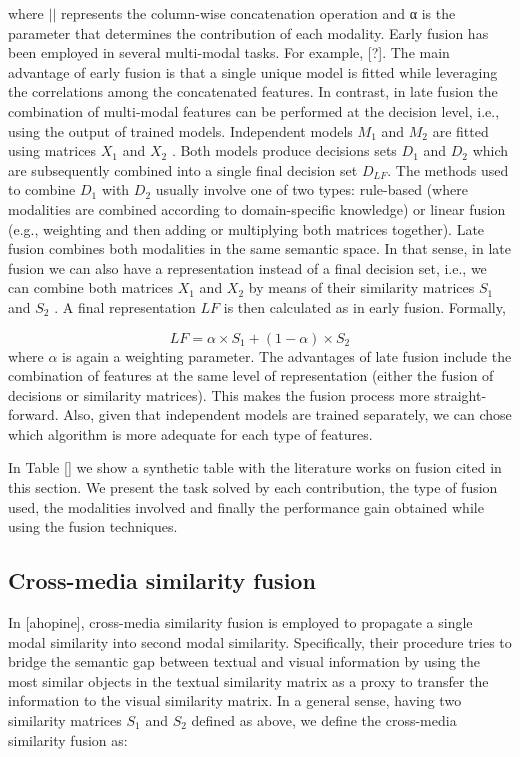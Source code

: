 \documentclass[11pt]{article}
\begin{document}
where $||$ represents the column-wise concatenation operation and α is the parameter that determines the contribution of each modality. 
%
Early fusion has been employed in several multi-modal tasks. For example, [?]. The main advantage of early fusion is that a single unique model is fitted while leveraging the correlations among the concatenated features.
%
In contrast, in late fusion the combination of multi-modal features can be performed at the decision level, i.e., using the output of trained models. Independent models $M_1$ and $M_2$ are fitted using matrices $X_1$ and $X_2$ . Both models produce decisions sets $D_1$ and $D_2$ which are subsequently combined into a single final decision set $D_{LF}$.
%
The methods used to combine $D_1$ with $D_2$ usually involve one of two types: rule-based (where modalities are combined according to domain-specific knowledge) or linear fusion (e.g., weighting and then adding or multiplying both matrices together).
%
Late fusion combines both modalities in the same semantic space. In that sense, in late fusion we can also have a representation instead of a final decision set, i.e., we can combine both matrices $X_1$ and $X_2$ by means of their similarity matrices $S_1$ and $S_2$ . A final representation $LF$ is then calculated as in early fusion. Formally,

\begin{equation}
LF = \alpha \times S_1 + (1 - \alpha) \times S_2
\end{equation}
where $\alpha$ is again a weighting parameter.
%
The advantages of late fusion include the combination of features at the same level of representation (either the fusion of decisions or similarity matrices). This makes the fusion process more straight-forward. Also, given that independent models are trained separately, we can chose which algorithm is more adequate for each type of
features.

In Table [] we show a synthetic table with the
literature works on fusion cited in this section. We present the task solved by each contribution, the
type of fusion used, the modalities involved and finally the performance gain obtained while using
the fusion techniques.
%
\subsection{Cross-media similarity fusion}
In [ahopine], cross-media similarity fusion is employed to propagate a single modal
similarity into second modal similarity. Specifically, their procedure tries to bridge the semantic
gap between textual and visual information by using the most similar objects in the textual similarity matrix as a proxy to transfer the information to the visual similarity matrix. In a general sense,
having two similarity matrices $S_1$ and $S_2$ defined as above, we define the cross-media similarity fusion as:
\end{document}
